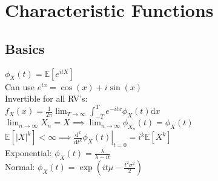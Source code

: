 \section{Characteristic Functions}
	\subsection*{Basics}
	$\phi_{X}\left(t\right) = \mathbb{E}\left[e^{itX}\right]$\\
	Can use $e^{ix} = \cos\left(x\right) + i\sin\left(x\right)$\\
	Invertible for all RV's:\\
	$f_{X}\left(x\right) = \frac{1}{2\pi}\lim_{T\to\infty}\int_{-T}^{T}\!e^{-itx}\phi_{X}\left(t\right)\!\mathrm{d}x$\\
	$\lim_{n\to\infty}X_{n} = X\implies\lim_{n\to\infty}\phi_{X_{n}}\left(t\right) = \phi_{X}\left(t\right)$\\
	$\mathbb{E}\left[\left|X\right|^{k}\right] < \infty\implies\left.\frac{\mathrm{d}^{k}}{\mathrm{d}t^{k}}\phi_{X}\!\left(t\right)\right|_{t=0} = i^{k}\mathbb{E}\left[X^{k}\right]$\\
	Exponential: $\phi_{X}\left(t\right) = \frac{\lambda}{\lambda - it}$\\
	Normal: $\phi_{X}\left(t\right) = \exp\left(it\mu - \frac{t^{2}\sigma^{2}}{2}\right)$
	